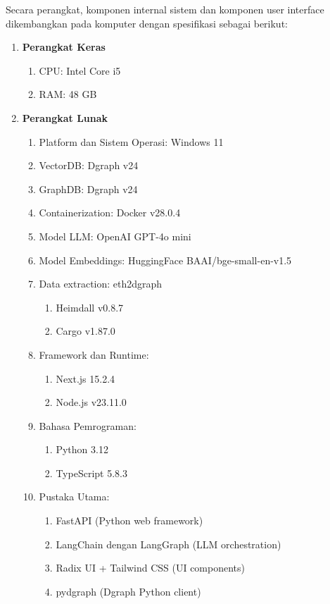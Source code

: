 Secara perangkat, komponen internal sistem dan komponen user interface dikembangkan pada komputer dengan spesifikasi sebagai berikut:
\begin{enumerate}
	\item \textbf{Perangkat Keras}
	      \begin{enumerate}
		      \item CPU: Intel Core i5
		      \item RAM: 48 GB
	      \end{enumerate}
	\item \textbf{Perangkat Lunak}
	      \begin{enumerate}
		      \item Platform dan Sistem Operasi: Windows 11
		      \item VectorDB: Dgraph v24
		      \item GraphDB: Dgraph v24
		      \item Containerization: Docker v28.0.4
		      \item Model LLM: OpenAI GPT-4o mini
		      \item Model Embeddings: HuggingFace BAAI/bge-small-en-v1.5
		      \item Data extraction: eth2dgraph
		            \begin{enumerate}
						\item Heimdall v0.8.7
						\item Cargo v1.87.0
					\end{enumerate}
		      \item Framework dan Runtime:
		            \begin{enumerate}
			            \item Next.js 15.2.4
			            \item Node.js v23.11.0
		            \end{enumerate}
		      \item Bahasa Pemrograman:
		            \begin{enumerate}
			            \item Python 3.12
			            \item TypeScript 5.8.3
		            \end{enumerate}
		      \item Pustaka Utama:
		            \begin{enumerate}
			            \item FastAPI (Python web framework)
			            \item LangChain dengan LangGraph (LLM orchestration)
			            \item Radix UI + Tailwind CSS (UI components)
			            \item pydgraph (Dgraph Python client)
		            \end{enumerate}
	      \end{enumerate}
\end{enumerate}